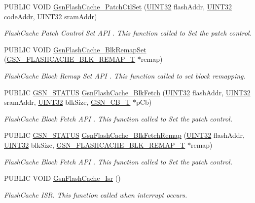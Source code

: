 \begin{DoxyCompactItemize}
PUBLIC VOID \hyperlink{a00646_ga99b3dc41971d1f1f697e1f34327ec67a}{GsnFlashCache\_\-PatchCtlSet} (\hyperlink{a00660_gae1e6edbbc26d6fbc71a90190d0266018}{UINT32} flashAddr, \hyperlink{a00660_gae1e6edbbc26d6fbc71a90190d0266018}{UINT32} codeAddr, \hyperlink{a00660_gae1e6edbbc26d6fbc71a90190d0266018}{UINT32} sramAddr)
\begin{DoxyCompactList}\small\item\em FlashCache Patch Control Set API . This function called to Set the patch control. \end{DoxyCompactList}\item 
PUBLIC VOID \hyperlink{a00646_gab5bdf5d796b051886522ef35896af58d}{GsnFlashCache\_\-BlkRemapSet} (\hyperlink{a00074}{GSN\_\-FLASHCACHE\_\-BLK\_\-REMAP\_\-T} $\ast$remap)
\begin{DoxyCompactList}\small\item\em FlashCache Block Remap Set API . This function called to set block remapping. \end{DoxyCompactList}\item 
PUBLIC \hyperlink{a00660_gada5951904ac6110b1fa95e51a9ddc217}{GSN\_\-STATUS} \hyperlink{a00646_gad138b011fece31ba57b80a7958cf0f2e}{GsnFlashCache\_\-BlkFetch} (\hyperlink{a00660_gae1e6edbbc26d6fbc71a90190d0266018}{UINT32} flashAddr, \hyperlink{a00660_gae1e6edbbc26d6fbc71a90190d0266018}{UINT32} sramAddr, \hyperlink{a00660_gae1e6edbbc26d6fbc71a90190d0266018}{UINT32} blkSize, \hyperlink{a00036}{GSN\_\-CB\_\-T} $\ast$pCb)
\begin{DoxyCompactList}\small\item\em FlashCache Block Fetch API . This function called to Set the patch control. \end{DoxyCompactList}\item 
PUBLIC \hyperlink{a00660_gada5951904ac6110b1fa95e51a9ddc217}{GSN\_\-STATUS} \hyperlink{a00646_gaa5de2c0431007a1e0955a3e9eb64dbd4}{GsnFlashCache\_\-BlkFetchRemap} (\hyperlink{a00660_gae1e6edbbc26d6fbc71a90190d0266018}{UINT32} flashAddr, \hyperlink{a00660_gae1e6edbbc26d6fbc71a90190d0266018}{UINT32} blkSize, \hyperlink{a00074}{GSN\_\-FLASHCACHE\_\-BLK\_\-REMAP\_\-T} $\ast$remap)
\begin{DoxyCompactList}\small\item\em FlashCache Block Fetch API . This function called to Set the patch control. \end{DoxyCompactList}\item 
PUBLIC VOID \hyperlink{a00646_gac5cd525683f7c493ae58ab5bd13aa583}{GsnFlashCache\_\-Isr} ()
\begin{DoxyCompactList}\small\item\em FlashCache ISR. This function called when interrupt occurs. \end{DoxyCompactList}\end{DoxyCompactItemize}


